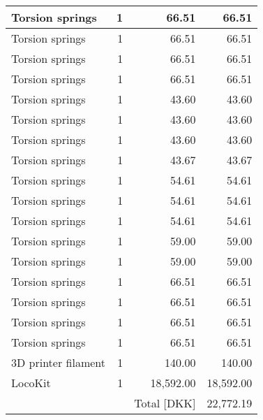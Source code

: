 \begin{table}[htbp]
\begin{tabular}{l|r|r|r}
Torsion springs & 1 & 66.51 & 66.51 \\ \hline
Torsion springs & 1 & 66.51 & 66.51 \\ \hline
Torsion springs & 1 & 66.51 & 66.51 \\ \hline
Torsion springs & 1 & 66.51 & 66.51 \\ \hline
Torsion springs & 1 & 43.60 & 43.60 \\ \hline
Torsion springs & 1 & 43.60 & 43.60 \\ \hline
Torsion springs & 1 & 43.60 & 43.60 \\ \hline
Torsion springs & 1 & 43.67 & 43.67 \\ \hline
Torsion springs & 1 & 54.61 & 54.61 \\ \hline
Torsion springs & 1 & 54.61 & 54.61 \\ \hline
Torsion springs & 1 & 54.61 & 54.61 \\ \hline
Torsion springs & 1 & 59.00 & 59.00 \\ \hline
Torsion springs & 1 & 59.00 & 59.00 \\ \hline
Torsion springs & 1 & 66.51 & 66.51 \\ \hline
Torsion springs & 1 & 66.51 & 66.51 \\ \hline
Torsion springs & 1 & 66.51 & 66.51 \\ \hline
Torsion springs & 1 & 66.51 & 66.51 \\ \hline
3D printer filament & 1 & 140.00 & 140.00 \\ \hline
LocoKit  & 1 & 18,592.00 & 18,592.00 \\ \hline
\multicolumn{2}{l}{} & Total [DKK] & 22,772.19 \\
\end{tabular}
\label{tab:material_cost}
\end{table}

\begin{table}[htbp]
\caption{Software cost}
\begin{center}
\end{center}
\label{tab:sofware_cost}
\end{table}

